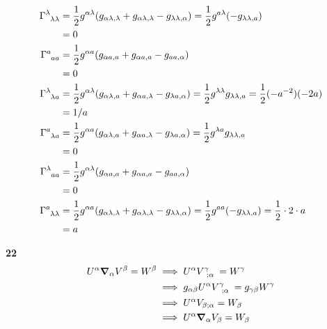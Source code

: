 \documentclass[gr-notes.tex]{subfiles}
\begin{document}
\begin{align*}
  \tensor{\Gamma}{^\lambda_{\lambda \lambda}} &=
  \frac{1}{2} g^{\alpha \lambda}
  (g_{\alpha \lambda , \lambda} + g_{\alpha \lambda , \lambda} - g_{\lambda \lambda , \alpha}) =
  \frac{1}{2} g^{a\lambda} (-g_{\lambda\lambda,a})
  \\ &=
  0
  \\
  \tensor{\Gamma}{^a_{a a}} &=
  \frac{1}{2} g^{\alpha a}
  (g_{\alpha a , a} + g_{\alpha a , a} - g_{a a , \alpha})
  \\ &=
  0
  \\
  \tensor{\Gamma}{^\lambda_{\lambda a}} &=
  \frac{1}{2} g^{\alpha \lambda}
  (g_{\alpha \lambda , a} + g_{\alpha a , \lambda} - g_{\lambda a , \alpha}) =
  \frac{1}{2} g^{\lambda\lambda} g_{\lambda\lambda,a} =
  \frac{1}{2} (-a^{-2}) (-2a)
  \\ &=
  1/a
  \\
  \tensor{\Gamma}{^a_{\lambda a}} &=
  \frac{1}{2} g^{\alpha a}
  (g_{\alpha \lambda , a} + g_{\alpha a , \lambda} - g_{\lambda a , \alpha}) =
  \frac{1}{2} g^{\lambda a} g_{\lambda\lambda,a}
  \\ &=
  0
  \\
  \tensor{\Gamma}{^\lambda_{a a}} &=
  \frac{1}{2} g^{\alpha \lambda}
  (g_{\alpha a , a} + g_{\alpha a , a} - g_{a a , \alpha})
  \\ &=
  0
  \\
  \tensor{\Gamma}{^a_{\lambda \lambda}} &=
  \frac{1}{2} g^{\alpha a}
  (g_{\alpha \lambda , \lambda} + g_{\alpha \lambda , \lambda} - g_{\lambda \lambda , \alpha}) =
  \frac{1}{2} g^{aa} (-g_{\lambda\lambda,a}) =
  \frac{1}{2} \cdot 2 \cdot a
  \\ &=
  a
\end{align*}




\textbf{22}
%
\begin{align*}
  U^\alpha \grad_\alpha V^\beta = W^\beta &\implies
  U^\alpha \tensor{V}{^\gamma_{;\alpha}} = W^\gamma
  \\ &\implies
  g_{\alpha\beta} U^\alpha \tensor{V}{^\gamma_{;\alpha}} =
  g_{\gamma\beta} W^\gamma
  \\ &\implies
  U^\alpha V_{\beta;\alpha} = W_\beta
  \\ &\implies
  U^\alpha \grad_\alpha V_\beta = W_\beta
\end{align*}
\end{document}
